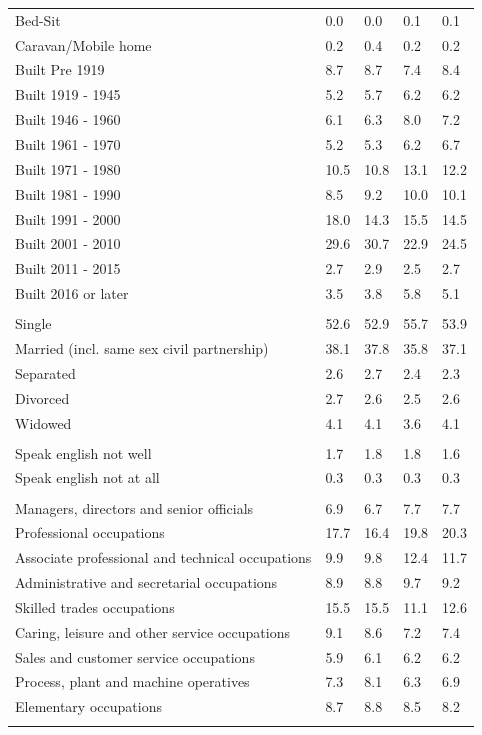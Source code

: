\documentclass{article}
\begin{document}
\begin{table}[h]
\begin{tabular}{KTTTT}
Bed-Sit & 0.0& 0.0& 0.1& 0.1\\
Caravan/Mobile home & 0.2& 0.4& 0.2& 0.2\\
    \hline
Built Pre 1919 & 8.7& 8.7& 7.4& 8.4\\
Built 1919 - 1945 & 5.2& 5.7& 6.2& 6.2\\
Built  1946 - 1960 & 6.1& 6.3& 8.0& 7.2\\
Built  1961 - 1970 & 5.2& 5.3& 6.2& 6.7\\
Built  1971 - 1980 & 10.5& 10.8& 13.1& 12.2\\
Built  1981 - 1990 &  8.5&  9.2& 10.0& 10.1\\
Built  1991 - 2000 & 18.0& 14.3& 15.5& 14.5\\
Built  2001 - 2010 & 29.6& 30.7& 22.9& 24.5\\
Built  2011 - 2015 & 2.7& 2.9& 2.5& 2.7\\
Built  2016 or later & 3.5& 3.8& 5.8& 5.1\\
\hline
    \\
    \hline
Single & 52.6& 52.9& 55.7& 53.9\\
Married (incl. same sex civil partnership) & 38.1& 37.8& 35.8& 37.1\\
Separated  & 2.6& 2.7& 2.4& 2.3\\
Divorced  & 2.7& 2.6& 2.5& 2.6\\
Widowed & 4.1& 4.1& 3.6& 4.1\\
\hline
    \\ 
    \hline
Speak english not well & 1.7& 1.8& 1.8& 1.6\\
Speak english not at all & 0.3& 0.3& 0.3& 0.3\\
\hline
    \\
    \hline
Managers, directors and senior officials & 6.9& 6.7& 7.7& 7.7\\
Professional occupations & 17.7& 16.4& 19.8& 20.3\\
Associate professional and technical occupations &  9.9&  9.8& 12.4& 11.7\\
Administrative and secretarial occupations & 8.9& 8.8& 9.7& 9.2\\
Skilled trades occupations & 15.5& 15.5& 11.1& 12.6\\
Caring, leisure and other service occupations & 9.1& 8.6& 7.2& 7.4\\
Sales and customer service occupations & 5.9& 6.1& 6.2& 6.2\\
Process, plant and machine operatives & 7.3& 8.1& 6.3& 6.9\\
Elementary occupations & 8.7& 8.8& 8.5& 8.2\\
\hline
\end{tabular}
\end{table}
\end{document}
